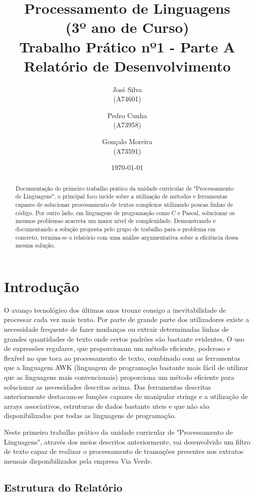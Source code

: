 \documentclass{report}
\title{Processamento de Linguagens\\ (3º ano de Curso)\\ \textbf{Trabalho Prático nº1 - Parte A}\\ Relatório de Desenvolvimento}
\author{José Silva\\ (A74601) \and Pedro Cunha\\ (A73958) \and Gonçalo Moreira\\ (A73591) }
\date{\today}
\begin{document}
\maketitle

\begin{abstract}
Documentação do primeiro trabalho prático da
 unidade curricular de "Processamento de Linguagens", o principal foco 
 incide sobre a utilização de métodos e ferramentas capazes de solucionar 
 processamento de textos complexos utilizando poucas linhas de código. Por 
 outro lado, em linguagens de programação como C e Pascal, solucionar os 
 mesmos problemas acarreta um maior nível de complexidade. Demonstrando e 
 documentando a solução proposta pelo grupo de trabalho para o problema em 
 concreto, termina-se o relatório com uma análise argumentativa sobre a 
 eficiência dessa mesma solução.
\end{abstract}

\tableofcontents


\chapter{Introdução} \label{intro}

O avanço tecnológico dos últimos anos trouxe consigo a inevitabilidade de processar cada vez mais texto.
Por parte de grande parte dos utilizadores existe a necessidade frequente de fazer mudanças ou extrair determinadas
linhas de grandes quantidades de texto onde certos padrões são bastante evidentes.
O uso de expressões regulares, que proporcionam um método eficiente, poderoso e flexível no que toca ao processamento de texto,
combinado com as ferramentas que a linguagem AWK (linguagem de programação bastante mais fácil de utilizar que as linguagens mais
convencionais) proporciona um método eficiente para solucionar as necessidades descritas acima. Das ferramentas descritas anteriormente
destacam-se funções capazes de manipular strings e a utilização de arrays associativos, estruturas de dados bastante uteis e que não são
disponibilizadas por todas as linguagens de programação.

Neste primeiro trabalho prático da unidade curricular de "Processamento de Linguagens", através dos meios descritos anteriormente,
vai desenvolvido um filtro de texto capaz de realizar o processamento de transações presentes nos extratos mensais disponibilizados
pela empresa Via Verde.


\section*{Estrutura do Relatório} \
\end{document}
